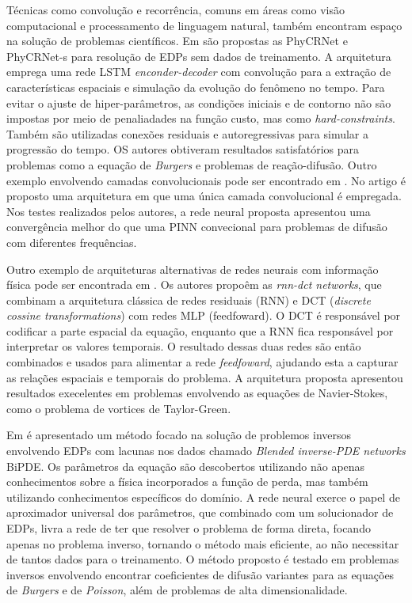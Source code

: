 Técnicas como convolução e recorrência, comuns em áreas como visão computacional 
e processamento de linguagem natural, também encontram espaço na solução de problemas
científicos. Em \cite{ren-etal:2022-phycrnet} são propostas as PhyCRNet e PhyCRNet-s
para resolução de EDPs sem dados de treinamento. A arquitetura emprega uma rede
LSTM \textit{enconder-decoder} com convolução para a extração de características
espaciais e simulação da evolução do fenômeno no tempo.
Para evitar o ajuste de hiper-parâmetros, as condições iniciais e de contorno não
são impostas por meio de penaliadades na função custo, mas como \textit{hard-constraints}.
Também são utilizadas conexões residuais e autoregressivas para simular a progressão
do tempo. OS autores obtiveram resultados satisfatórios para problemas como a 
equação de \textit{Burgers} e problemas de reação-difusão.
Outro exemplo envolvendo camadas convolucionais pode ser encontrado em 
\cite{shi-etal:24-convnet}. No artigo é proposto uma arquitetura em que uma única 
camada convolucional é empregada. Nos testes realizados pelos autores, a rede 
neural proposta apresentou uma convergência melhor do que uma PINN convecional 
para problemas de difusão com diferentes frequências.

Outro exemplo de arquiteturas alternativas de redes neurais com informação física
pode ser encontrada em \cite{benjamin-etal:2022-rnn-dct-networks}. 
Os autores propoêm as \textit{rnn-dct networks}, que combinam a arquitetura clássica
de redes residuais (RNN) e DCT (\textit{discrete cossine transformations}) com 
redes MLP (feedfoward). O DCT é responsável por codificar a parte espacial da equação,
enquanto que a RNN fica responsável por interpretar os valores temporais.
O resultado dessas duas redes são então combinados e usados para alimentar a rede
\textit{feedfoward}, ajudando esta a capturar as relações espaciais e temporais do
problema. A arquitetura proposta apresentou resultados execelentes em problemas 
envolvendo as equações de Navier-Stokes, como o problema de vortices de Taylor-Green.

Em \cite{pakravan-et:2021-bipde} é apresentado um método focado na solução de 
problemos inversos envolvendo EDPs com lacunas nos dados chamado 
\textit{Blended inverse-PDE networks} BiPDE.
Os parâmetros da equação são descobertos utilizando não apenas conhecimentos sobre
a física incorporados a função de perda, mas também utilizando conhecimentos específicos 
do domínio. 
A rede neural exerce o papel de aproximador universal dos parâmetros, que combinado 
com um solucionador de EDPs, livra a rede de ter que resolver o problema de 
forma direta, focando apenas no problema inverso, tornando o método mais eficiente,
ao não necessitar de tantos dados para o treinamento.
O método proposto é testado em problemas inversos envolvendo encontrar coeficientes
de difusão variantes para as equações de \textit{Burgers} e de \textit{Poisson}, 
além de problemas de alta dimensionalidade.

